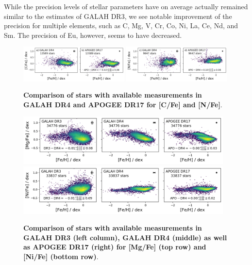 \documentclass[
  journal=pasa,
  manuscript=research-paper, %
  year=2024,
  volume=37
]{cup-journal}
\begin{document}
While the precision levels of stellar parameters have on average actually remained similar to the estimates of GALAH DR3, we see notable improvement of the precision for multiple elements, such as C, Mg, V, Cr, Co, Ni, La, Ce, Nd, and Sm. The precision of Eu, however, seems to have decreased.

\begin{figure}[ht]
 \centering
 \includegraphics[width=0.49\textwidth]{figures/comparison_dr4_apo17_C_fe.png}
 \includegraphics[width=0.49\textwidth]{figures/comparison_dr4_apo17_N_fe.png}
 \caption{\textbf{Comparison of stars with available measurements in GALAH DR4 and APOGEE DR17 for [C/Fe] and [N/Fe]}.}
 \label{fig:comparison_dr4_apo17}
\end{figure}

\begin{figure}[ht]
 \centering
 \includegraphics[width=0.97\textwidth]{figures/comparison_dr4_dr3_apo17_Mg_fe.png}
 \includegraphics[width=0.97\textwidth]{figures/comparison_dr4_dr3_apo17_Ni_fe.png}
 \caption{\textbf{Comparison of stars with available measurements in GALAH DR3 (left column), GALAH DR4 (middle) as well as APOGEE DR17 (right) for [Mg/Fe] (top row) and [Ni/Fe] (bottom row)}.}
 \label{fig:comparison_dr4_dr3_apo17}
\end{figure}
\end{document}

